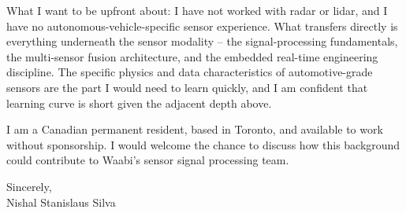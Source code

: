 \documentclass[11pt]{article}
\begin{document}
\vspace{0.5em}

What I want to be upfront about: I have not worked with radar or lidar, and I have no autonomous-vehicle-specific sensor experience. What transfers directly is everything underneath the sensor modality -- the signal-processing fundamentals, the multi-sensor fusion architecture, and the embedded real-time engineering discipline. The specific physics and data characteristics of automotive-grade sensors are the part I would need to learn quickly, and I am confident that learning curve is short given the adjacent depth above.

\vspace{0.5em}

I am a Canadian permanent resident, based in Toronto, and available to work without sponsorship. I would welcome the chance to discuss how this background could contribute to Waabi's sensor signal processing team.

\vspace{1em}

Sincerely, \\
Nishal Stanislaus Silva
\end{document}
